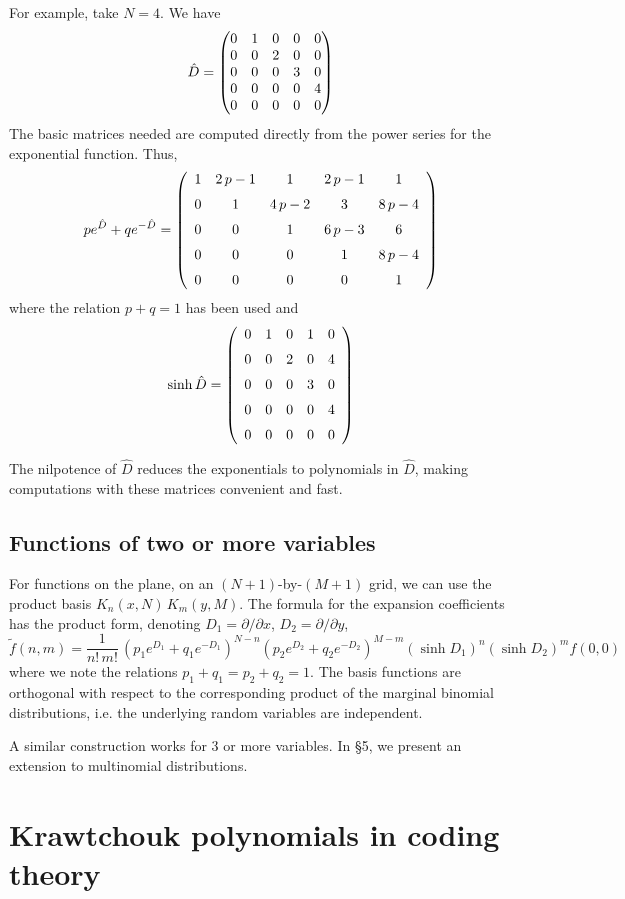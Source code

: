 \documentclass[runningheads]{llncs}
\begin{document}
For example, take $N=4$. We have
$$\hat D= \begin{pmatrix}0&1&0&0&0 \cr 0&0&2&0&0 \cr 0&0&0&3&0\cr 0&0&0&0&4\cr 0&0&0&0&0 \end{pmatrix}$$
The basic matrices needed are computed directly from the power series for the exponential function. Thus,
$$pe^{\hat D}+qe^{-\hat D}=
 \left( \begin {array}{ccccc} 1&2\,p-1&1&2\,p-1&1\\\noalign{\medskip}0
&1&4\,p-2&3&8\,p-4\\\noalign{\medskip}0&0&1&6\,p-3&6
\\\noalign{\medskip}0&0&0&1&8\,p-4\\\noalign{\medskip}0&0&0&0&1
\end {array} \right)$$
where the relation $p+q=1$ has been used and
$$\sinh\hat D= \left( \begin {array}{ccccc} 0&1&0&1&0\\\noalign{\medskip}0&0&2&0&4
\\\noalign{\medskip}0&0&0&3&0\\\noalign{\medskip}0&0&0&0&4
\\\noalign{\medskip}0&0&0&0&0\end {array} \right)$$

The nilpotence of $\hat D$ reduces the exponentials to polynomials in $\hat D$, making computations with these matrices convenient and fast.

\subsection{Functions of two or more variables}
For functions on the plane, on an $(N+1)$-by-$(M+1)$ grid, we can use the product basis $K_n(x,N)\,K_m(y,M)$. The formula for the expansion coefficients
has the product form, denoting $D_1=\partial/\partial x$, $D_2=\partial/\partial y$,
$$\tilde f(n,m)=\frac{1}{n!\,m!}\,(p_1e^{D_1}+q_1e^{-D_1})^{N-n}(p_2e^{D_2}+q_2e^{-D_2})^{M-m}(\sinh D_1)^n(\sinh D_2)^mf(0,0)$$
where we note the relations $p_1+q_1=p_2+q_2=1$. The basis functions are orthogonal with respect to the corresponding
product of the marginal binomial distributions, i.e. the underlying random variables are independent.\bigskip

A similar construction works for 3 or more variables. In \S5, we present an extension to multinomial distributions.

\section{Krawtchouk polynomials in coding theory}
\end{document}
